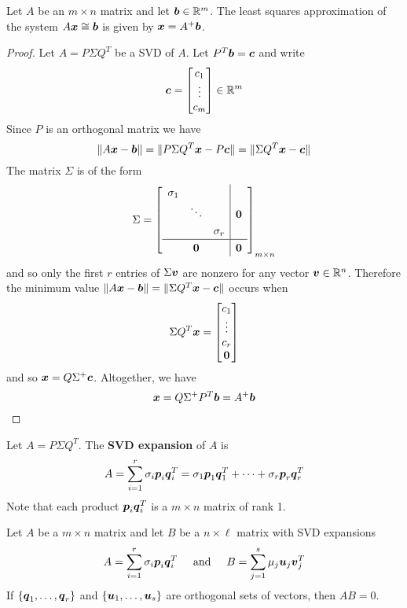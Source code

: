 \begin{theorem}
Let $A$ be an $m \times n$ matrix and let $\boldsymbol{b} \in \mathbb{R}^m$. The least squares approximation of the system $A \boldsymbol{x} \cong \boldsymbol{b}$ is given by $\boldsymbol{x} = A^+ \boldsymbol{b}$.

\begin{proof}
Let $A = P \Sigma Q^T$ be a SVD of $A$. Let $P^T \boldsymbol{b} = \boldsymbol{c}$ and write
$$
\boldsymbol{c} = \begin{bmatrix}
c_1 \\ \vdots \\ c_m \end{bmatrix}
\in \mathbb{R}^m
$$
Since $P$ is an orthogonal matrix we have
$$
\| A \boldsymbol{x} - \boldsymbol{b} \| = \| P \Sigma Q^T \boldsymbol{x} - P \boldsymbol{c} \| = \| \Sigma Q^T \boldsymbol{x} - \boldsymbol{c} \|
$$
The matrix $\Sigma$ is of the form
$$
\Sigma =
\renewcommand{\arraystretch}{1.25}
\left[ \begin{array}{ccc|c}
\sigma_1 & & & \\
& \ddots & & \bs{0} \\
& & \sigma_r & \\ \hline
& \bs{0} & & \bs{0}
\end{array} \right]_{m \times n}
\renewcommand{\arraystretch}{1}
$$
and so only the first $r$ entries of $\Sigma \boldsymbol{v}$ are nonzero for any vector $\boldsymbol{v} \in \mathbb{R}^n$. Therefore the minimum value $\| A \boldsymbol{x} - \boldsymbol{b} \| = \| \Sigma Q^T \boldsymbol{x} - \boldsymbol{c} \|$ occurs when
$$
\Sigma Q^T \boldsymbol{x}
= \begin{bmatrix}
c_1 \\ \vdots \\ c_r \\ \boldsymbol{0} \end{bmatrix}
$$
and so $\boldsymbol{x} = Q \Sigma^+ \boldsymbol{c}$. Altogether, we have
$$
\boldsymbol{x} = Q \Sigma^+ P^T \boldsymbol{b} = A^+ \boldsymbol{b}
$$
\end{proof}
\end{theorem}

\begin{definition}
Let $A = P \Sigma Q^T$. The {\bf SVD expansion} of $A$ is
$$
A = \sum_{i=1}^r \sigma_i \boldsymbol{p}_i \boldsymbol{q}_i^T = \sigma_1 \boldsymbol{p}_1 \boldsymbol{q}_1^T + \cdots + \sigma_r \boldsymbol{p}_r \boldsymbol{q}_r^T
$$
Note that each product $\boldsymbol{p}_i \boldsymbol{q}_i^T$ is a $m \times n$ matrix of rank 1.
\end{definition}

\begin{proposition}
Let $A$ be a $m \times n$ matrix and let $B$ be a $n \times \ell$ matrix with SVD expansions
$$
A = \sum_{i=1}^r \sigma_i \boldsymbol{p}_i \boldsymbol{q}_i^T
\hspace{5mm} \text{and} \hspace{5mm}
B = \sum_{j=1}^s \mu_j \boldsymbol{u}_j \boldsymbol{v}_j^T
$$
If $\{ \boldsymbol{q}_1,\dots,\boldsymbol{q}_r \}$ and $\{ \boldsymbol{u}_1,\dots,\boldsymbol{u}_s \}$ are orthogonal sets of vectors, then $AB = 0$.
\end{proposition}

